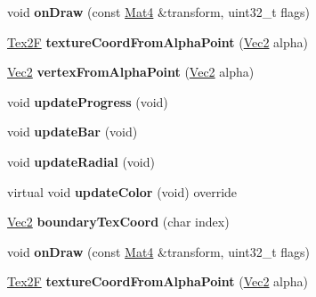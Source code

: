 \begin{DoxyCompactItemize}
\item 
\mbox{\label{classProgressTimer_a9a87492e087cc845024b28470dc79855}} 
void {\bfseries on\+Draw} (const \hyperlink{classMat4}{Mat4} \&transform, uint32\+\_\+t flags)
\item 
\mbox{\label{classProgressTimer_a6290a574830e3455828c3acae65b6157}} 
\hyperlink{structTex2F}{Tex2F} {\bfseries texture\+Coord\+From\+Alpha\+Point} (\hyperlink{classVec2}{Vec2} alpha)
\item 
\mbox{\label{classProgressTimer_a88cfd67d1031815c3ac363d39a23afc8}} 
\hyperlink{classVec2}{Vec2} {\bfseries vertex\+From\+Alpha\+Point} (\hyperlink{classVec2}{Vec2} alpha)
\item 
\mbox{\label{classProgressTimer_a7218bccd4f74911a53b4242a24914133}} 
void {\bfseries update\+Progress} (void)
\item 
\mbox{\label{classProgressTimer_af49361f4d7043a3d070dbed3f7fec95f}} 
void {\bfseries update\+Bar} (void)
\item 
\mbox{\label{classProgressTimer_a865bf398e8cdbae67228b1af04921b3a}} 
void {\bfseries update\+Radial} (void)
\item 
\mbox{\label{classProgressTimer_affa0877198be4bdbd5ae6abdbf51010b}} 
virtual void {\bfseries update\+Color} (void) override
\item 
\mbox{\label{classProgressTimer_aae89a5b7ddd4348c4f8d28d5fe83f722}} 
\hyperlink{classVec2}{Vec2} {\bfseries boundary\+Tex\+Coord} (char index)
\item 
\mbox{\label{classProgressTimer_a9a87492e087cc845024b28470dc79855}} 
void {\bfseries on\+Draw} (const \hyperlink{classMat4}{Mat4} \&transform, uint32\+\_\+t flags)
\item 
\mbox{\label{classProgressTimer_a6290a574830e3455828c3acae65b6157}} 
\hyperlink{structTex2F}{Tex2F} {\bfseries texture\+Coord\+From\+Alpha\+Point} (\hyperlink{classVec2}{Vec2} alpha)

\end{DoxyCompactItemize}
